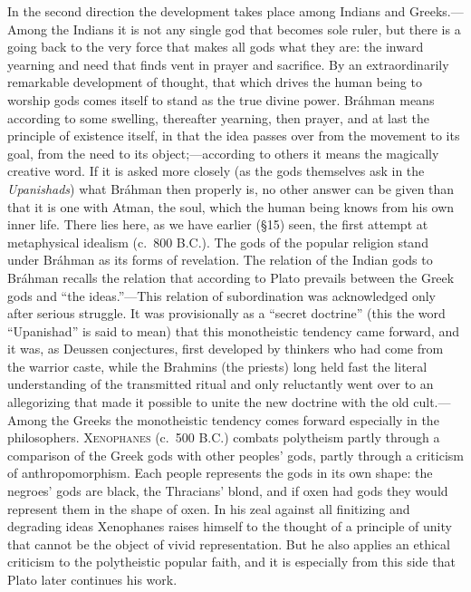 \documentclass[12pt,a4paper]{book}
\newcommand{\opage}[1]{\marginnote{\footnotesize\textit{[#1]}}}
\begin{document}
In the second direction the development takes place among Indians and Greeks.---Among the
Indians it is not any single god that becomes sole ruler, but there is a going back to the very
force that makes all gods what they are: the inward yearning and need that finds vent in prayer
and sacrifice. By an extraordinarily remarkable development of thought, that which drives the
human being to worship gods comes itself to stand as the true divine power.
\opage{104}Bráhman means according to some swelling, thereafter yearning, then prayer, and at last the
principle of existence itself, in that the idea passes over from the movement to its goal, from
the need to its object;---according to others it means the magically creative word. If it is
asked more closely (as the gods themselves ask in the \emph{Upanishads}) what Bráhman then
properly is, no other answer can be given than that it is one with Atman, the soul, which the
human being knows from his own inner life. There lies here, as we have earlier (§15) seen, the
first attempt at metaphysical idealism (c.~800 B.C.). The gods of the popular religion stand
under Bráhman as its forms of revelation. The relation of the Indian gods to Bráhman recalls
the relation that according to Plato prevails between the Greek gods and ``the ideas.''---This
relation of subordination was acknowledged only after serious struggle. It was provisionally as
a ``secret doctrine'' (this the word ``Upanishad'' is said to mean) that this monotheistic
tendency came forward, and it was, as Deussen conjectures, first developed by thinkers who had
come from the warrior caste, while the Brahmins (the priests) long held fast the literal
understanding of the transmitted ritual and only reluctantly went over to an allegorizing that
made it possible to unite the new doctrine with the old cult.---Among the Greeks the
monotheistic tendency comes forward especially in the philosophers. \textsc{Xenophanes}
(c.~500 B.C.) combats polytheism partly through a comparison of the Greek gods with other
peoples' gods, partly through a criticism of anthropomorphism. Each people represents the gods
in its own shape: the negroes' gods are black, the Thracians' blond, and if oxen had gods they
would represent them in the shape of oxen. In his zeal against all finitizing and degrading
ideas Xenophanes raises himself to the thought of a principle of unity that cannot be the object
of vivid representation. But he also applies an ethical criticism to the polytheistic popular
faith, and it is especially from this side that Plato later continues his work.
\end{document}
